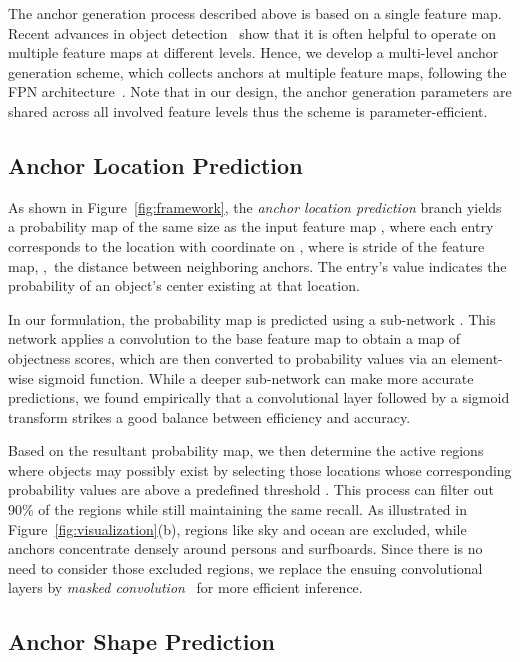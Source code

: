 \documentclass[10pt,twocolumn,letterpaper]{article}
\begin{document}
The anchor generation process described above is based on a single feature map.
Recent advances in object detection~\cite{lin2017feature,lin2017focal} show
that it is often helpful to operate on multiple feature maps at different levels.
Hence, we develop a multi-level anchor generation scheme, which collects
anchors at multiple feature maps, following the FPN architecture~\cite{lin2017feature}.
Note that in our design, the anchor generation parameters are shared
across all involved feature levels thus the scheme is parameter-efficient.

\subsection{Anchor Location Prediction}
\label{subsec:anchor-loc}

As shown in Figure~\ref{fig:framework}, the \emph{anchor location prediction}
branch yields a probability map  of the same size as the input
feature map , where each entry  corresponds to the location
with coordinate  on , where 
is stride of the feature map, \ie,~the distance between neighboring anchors.
The entry's value
indicates the probability of an object's center existing at that location.

In our formulation, the probability map  is predicted using a sub-network .
This network applies a  convolution to the base feature map 
to obtain a map of objectness scores, which are then converted to
probability values via an element-wise sigmoid function.
While a deeper sub-network can make more accurate predictions, we found
empirically that a convolutional layer followed by a sigmoid transform strikes
a good balance between efficiency and accuracy.

Based on the resultant probability map, we then determine the active regions
where objects may possibly exist by selecting those locations whose
corresponding probability values are above a predefined threshold .
This process can filter out 90\% of the regions while still
maintaining the same recall.
As illustrated in Figure~\ref{fig:visualization}(b), regions like sky and ocean
are excluded, while anchors concentrate densely around persons and surfboards.
Since there is no need to consider those excluded regions, we replace the ensuing
convolutional layers by \emph{masked convolution}~\cite{li2017not,song2018beyond}
for more efficient inference.


\subsection{Anchor Shape Prediction}
\label{subsec:anchor-shape}
\end{document}
